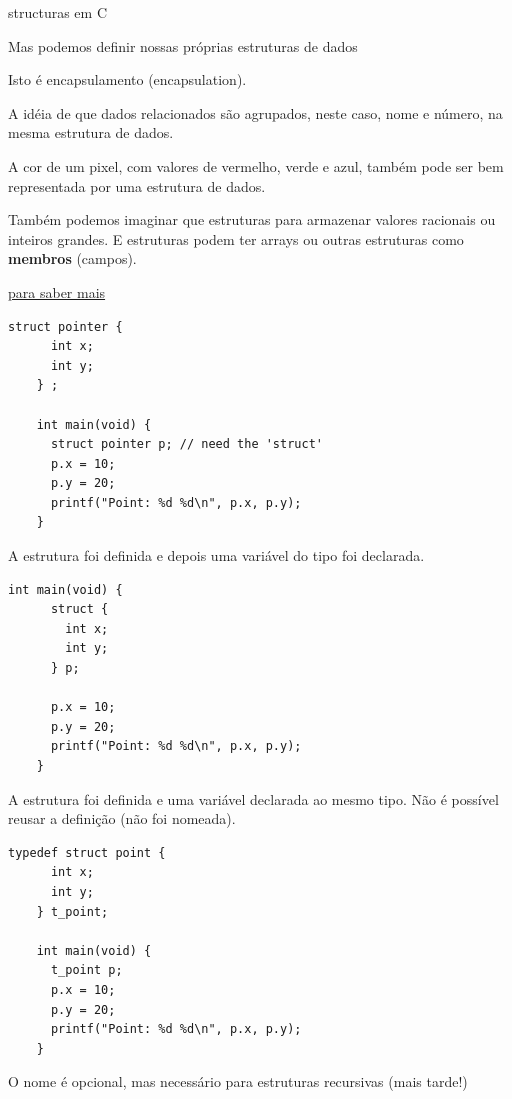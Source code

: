 \documentclass{beamer}
\begin{document}
\begin{frame}{structuras em C}

  Mas podemos definir nossas próprias estruturas de dados

  

  \framebreak

  Isto é encapsulamento (encapsulation).

  A idéia de que dados relacionados são agrupados, neste caso, nome e
  número, na mesma estrutura de dados.

  A cor de um pixel, com valores de vermelho, verde e azul, também
  pode ser bem representada por uma estrutura de dados.

  Também podemos imaginar que estruturas para armazenar valores
  racionais ou inteiros grandes. E estruturas podem ter arrays ou
  outras estruturas como \textbf{membros} (campos).

  \href{https://en.wikipedia.org/wiki/Struct_(C_programming_language)}{para saber mais}

  \framebreak

  \begin{lstlisting}[style=normalc]
    struct pointer {
      int x;
      int y;
    } ;
    
    int main(void) {
      struct pointer p; // need the 'struct'
      p.x = 10;
      p.y = 20;
      printf("Point: %d %d\n", p.x, p.y);
    }
  \end{lstlisting}

  A estrutura foi definida e depois uma variável do tipo foi
  declarada.

  \framebreak

  \begin{lstlisting}[style=normalc]
    int main(void) {
      struct {
        int x;
        int y;
      } p;
      
      p.x = 10;
      p.y = 20;
      printf("Point: %d %d\n", p.x, p.y);
    }
  \end{lstlisting}

  A estrutura foi definida e uma variável declarada ao mesmo tipo. Não
  é possível reusar a definição (não foi nomeada).

  \framebreak

  \begin{lstlisting}[style=normalc]
    typedef struct point {
      int x;
      int y;
    } t_point;
    
    int main(void) {
      t_point p;
      p.x = 10;
      p.y = 20;
      printf("Point: %d %d\n", p.x, p.y);
    }
  \end{lstlisting}

  O nome  é opcional, mas necessário para estruturas
  recursivas (mais tarde!)
  
\end{frame}
\end{document}
